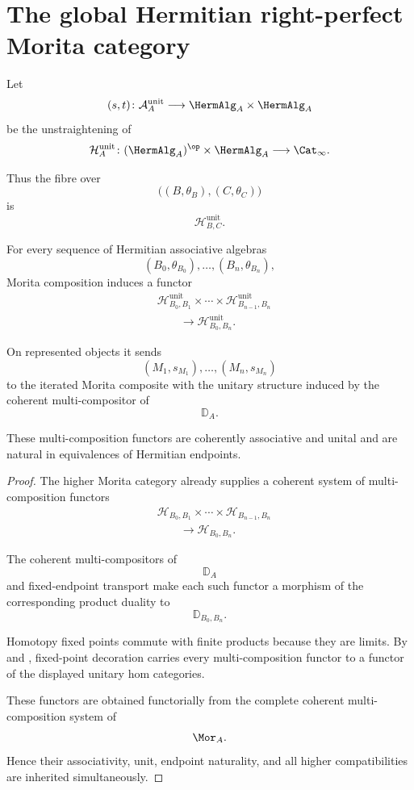 \section{The global Hermitian right-perfect Morita category}
\label{sec:global-hermitian-right-perfect-morita}

Let
\[
    (s,t)
    \colon
    \mathcal A_A^{\mathrm{unit}}
    \longrightarrow
    \HermAlg_A\times\HermAlg_A
\]
be the unstraightening of
\[
    \mathcal H_A^{\mathrm{unit}}
    \colon
    (\HermAlg_A)^{\op}
    \times
    \HermAlg_A
    \longrightarrow
    \Cat_\infty.
\]

Thus the fibre over
\[
    \bigl(
        (B,\theta_B),
        (C,\theta_C)
    \bigr)
\]
is
\[
    \mathcal H^{\mathrm{unit}}_{B,C}.
\]

\begin{proposition}
\label{prop:coherent-multicomposition-unitary-homs}
For every sequence of Hermitian associative algebras
\[
    (B_0,\theta_{B_0}),
    \ldots,
    (B_n,\theta_{B_n}),
\]
Morita composition induces a functor
\[
\begin{aligned}
    &
    \mathcal H^{\mathrm{unit}}_{B_0,B_1}
    \times
    \cdots
    \times
    \mathcal H^{\mathrm{unit}}_{B_{n-1},B_n}
    \\
    &\qquad\longrightarrow
    \mathcal H^{\mathrm{unit}}_{B_0,B_n}.
\end{aligned}
\]

On represented objects it sends
\[
    (M_1,s_{M_1}),
    \ldots,
    (M_n,s_{M_n})
\]
to the iterated Morita composite with the unitary structure induced by
the coherent multi-compositor of
\[
    \mathbb D_A.
\]

These multi-composition functors are coherently associative and unital
and are natural in equivalences of Hermitian endpoints.
\end{proposition}

\begin{proof}
The higher Morita category already supplies a coherent system of
multi-composition functors
\[
\begin{aligned}
    &
    \mathcal H_{B_0,B_1}
    \times
    \cdots
    \times
    \mathcal H_{B_{n-1},B_n}
    \\
    &\qquad\longrightarrow
    \mathcal H_{B_0,B_n}.
\end{aligned}
\]

The coherent multi-compositors of
\[
    \mathbb D_A
\]
and fixed-endpoint transport make each such functor a morphism of the
corresponding product duality to
\[
    \mathbb D_{B_0,B_n}.
\]

Homotopy fixed points commute with finite products because they are
limits. By
and
,
fixed-point decoration carries every multi-composition functor to a
functor of the displayed unitary hom categories.

These functors are obtained functorially from the complete coherent
multi-composition system of
\[
    \Mor_A.
\]
Hence their associativity, unit, endpoint naturality, and all higher
compatibilities are inherited simultaneously.
\end{proof}


